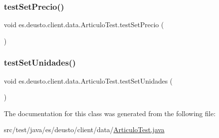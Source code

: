 \mbox{\label{classes_1_1deusto_1_1client_1_1data_1_1_articulo_test_ace1c88ea0ca5d2f9df55aa61a15fba37}} 
\subsubsection{\texorpdfstring{testSetPrecio()}{testSetPrecio()}}
{\footnotesize\ttfamily void es.\+deusto.\+client.\+data.\+Articulo\+Test.\+test\+Set\+Precio (\begin{DoxyParamCaption}{ }\end{DoxyParamCaption})}

\mbox{\label{classes_1_1deusto_1_1client_1_1data_1_1_articulo_test_a09931e201a7e383ba740f79b2180efe3}} 
\subsubsection{\texorpdfstring{testSetUnidades()}{testSetUnidades()}}
{\footnotesize\ttfamily void es.\+deusto.\+client.\+data.\+Articulo\+Test.\+test\+Set\+Unidades (\begin{DoxyParamCaption}{ }\end{DoxyParamCaption})}



The documentation for this class was generated from the following file\+:\begin{DoxyCompactItemize}
\item 
src/test/java/es/deusto/client/data/\mbox{\hyperlink{_articulo_test_8java}{Articulo\+Test.\+java}}\end{DoxyCompactItemize}
